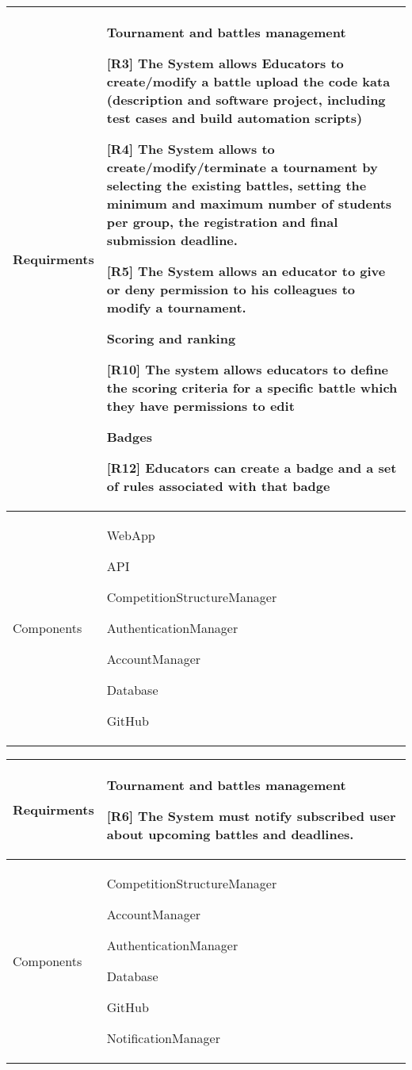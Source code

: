     
    \begin{table}[!h]
        \centering
        \begin{tabular}{ | m{6em} | m{30em} |} 
            \hline
             Requirments& \textbf{Tournament and battles management}
             
             
             [R3] The System allows Educators to create/modify a battle upload the code kata (description and software project, including test cases and build automation scripts)

             
    [R4] The System allows to create/modify/terminate a tournament by selecting the existing battles, setting the minimum and maximum number of students per group, the registration and final submission deadline.

    
    [R5] The System allows an educator to give or deny permission to his colleagues to modify a tournament.
    
    
    \textbf{Scoring and ranking}

    
    [R10] The system allows educators to define the scoring criteria for a specific battle which they have permissions to edit
    
    \textbf{Badges}
    
    [R12] Educators can create a badge and a set of rules associated with that badge
    \\
            \hline
             Components& WebApp

             API

             
             CompetitionStructureManager

             
             AuthenticationManager

             AccountManager

             Database
             
             GitHub\\
             \hline
        \end{tabular}
        \label{tab:my_label}
    \end{table}
        
        \begin{table}[!h]
        \centering
        \begin{tabular}{ | m{6em} | m{30em} |} 
            \hline
             Requirments&\textbf{Tournament and battles management}

             
    [R6] The System must notify subscribed user about upcoming battles and deadlines. \\

            \hline
             Components&
             CompetitionStructureManager

             AccountManager
             
             AuthenticationManager

             Database

             GitHub
             
             NotificationManager
             \\
             \hline
        \end{tabular}
        \label{tab:my_label}
    \end{table}
    
